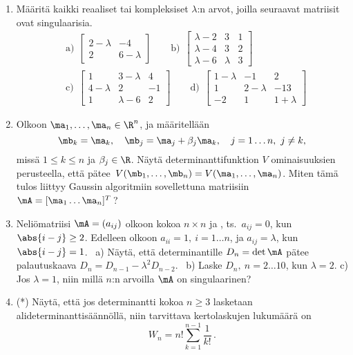 \begin{enumerate}
\item
Määritä kaikki reaaliset tai kompleksiset $\lambda$:n arvot, joilla seuraavat matriisit ovat
singulaarisia.
\begin{align*}
&\text{a)}\ \ \begin{bmatrix} 2-\lambda&-4 \\ 2&6-\lambda \end{bmatrix} \qquad
 \text{b)}\ \ \begin{bmatrix} 
              \lambda-2&3&1 \\ \lambda-4&3&2 \\ \lambda-6&\lambda&3 
              \end{bmatrix} \\[3mm]
&\text{c)}\ \ \begin{bmatrix}
              1&3-\lambda&4 \\ 4-\lambda&2&-1 \\ 1&\lambda-6&2
              \end{bmatrix} \qquad
 \text{d)}\ \ \begin{bmatrix}
              1-\lambda&-1&2 \\ 1&2-\lambda&-13 \\ -2&1&1+\lambda
              \end{bmatrix}
\end{align*}

\item
Olkoon $\ma_1, \ldots, \ma_n\in\R^n$, ja määritellään
\[
\mb_k=\ma_k, \quad \mb_j=\ma_j+\beta_j\ma_k, \quad j=1 \ldots n,\ j \neq k,
\]
missä $1 \le k \le n$ ja $\beta_j\in\R$. Näytä determinanttifunktion $V$ ominaisuuksien 
perusteella, että pätee $\,V(\mb_1, \ldots, \mb_n)=V(\ma_1, \ldots, \ma_n)$. Miten tämä tulos 
liittyy Gaussin algoritmiin sovellettuna matriisiin $\mA=[\ma_1 \ldots \ma_n]^T\,$?

\item {} 
Neliömatriisi $\mA=(a_{ij})$ olkoon kokoa $n \times n$ ja , ts.\
$a_{ij}=0$, kun $\abs{i-j} \ge 2$. Edelleen olkoon $a_{ii}=1,\ i=1 \ldots n$, ja 
$a_{ij}=\lambda$, kun $\abs{i-j}=1$. \ a) Näytä, että determinantille $D_n=\det\mA$ pätee
palautuskaava $D_n=D_{n-1}-\lambda^2 D_{n-2}$. \ b) Laske $D_n,\ n=2 \ldots 10$, kun
$\lambda=2$. c) Jos $\lambda=1$, niin millä $n$:n arvoilla $\mA$ on singulaarinen?

\item (*) \label{H-m-5: alidet-työ}
Näytä, että jos determinantti kokoa $n \ge 3$ lasketaan alideterminanttisäännöllä, niin
tarvittava kertolaskujen lukumäärä on
\[
W_n = n!\sum_{k=1}^{n-1} \frac{1}{k!}\,.
\]


\end{enumerate}
